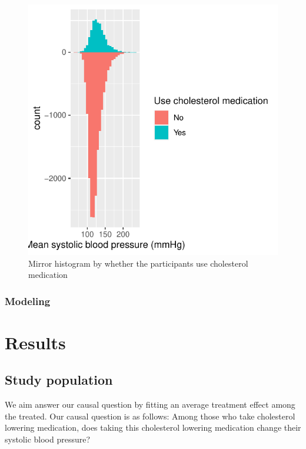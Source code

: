 \documentclass[useAMS,usenatbib,referee]{biom}
\begin{document}
\begin{figure}
\centering
\includegraphics{final-project_files/figure-latex/fig_eda-1.pdf}
\caption{Mirror histogram by whether the participants use cholesterol
medication}
\end{figure}

\hypertarget{modeling}{%
\subsubsection{Modeling}\label{modeling}}

\hypertarget{results}{%
\section{Results}\label{results}}

\hypertarget{study-population}{%
\subsection{Study population}\label{study-population}}

We aim answer our causal question by fitting an average treatment effect
among the treated. Our causal question is as follows: Among those who
take cholesterol lowering medication, does taking this cholesterol
lowering medication change their systolic blood pressure?
\end{document}
